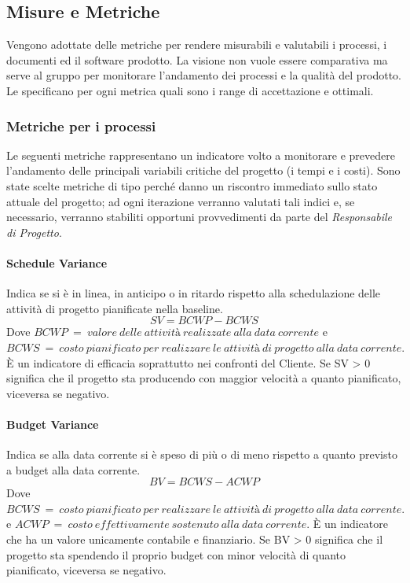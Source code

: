 		
	
	\subsection{Misure e Metriche}
	\label{MisureMetriche}
	Vengono adottate delle metriche per rendere misurabili e valutabili i processi, i documenti ed il software prodotto. La visione non vuole essere comparativa ma serve al gruppo per monitorare l'andamento dei processi e la qualità del prodotto. Le \NormeDiProgetto specificano per ogni metrica quali sono i range di accettazione e ottimali.
		
		\subsubsection{Metriche per i processi}
		Le seguenti metriche rappresentano un indicatore volto a monitorare e prevedere l'andamento delle principali variabili critiche del progetto (i tempi e i costi). Sono state scelte metriche di tipo  perché danno un riscontro immediato sullo stato attuale del progetto; ad ogni iterazione verranno valutati tali indici e, se necessario, verranno stabiliti opportuni provvedimenti da parte del \emph{Responsabile di Progetto}.
		
			\paragraph{Schedule Variance}		
			Indica se si è in linea, in anticipo o in ritardo rispetto alla schedulazione delle attività di progetto pianificate nella baseline.
			\[
			SV = BCWP - BCWS
			\]
			Dove $BCWP\  =\  valore \ delle \ attività \ realizzate \ alla\  data \ corrente$ e $BCWS \ = \ costo \ pianificato \ per\  realizzare\  le \ attività \ di \ progetto\  alla\  data \ corrente.$ 
			È un indicatore di efficacia soprattutto nei confronti del Cliente. Se SV > 0 significa che il progetto sta producendo con maggior velocità a quanto pianificato, viceversa se negativo.
			
			\paragraph{Budget Variance}
			Indica se alla data corrente si è speso di più o di meno rispetto a quanto previsto a budget alla data corrente.
			\[
			BV = BCWS - ACWP
			\]
			Dove $BCWS \ =\  costo\ pianificato\ per\ realizzare\ le\ attività \ di\  progetto \ alla\  data \ corrente.$ e $ACWP \ = \ costo \ effettivamente\  sostenuto \ alla \ data\  corrente.$
			È un indicatore che ha un valore unicamente contabile e finanziario. Se BV > 0 significa che il progetto sta spendendo il proprio budget con minor velocità di quanto pianificato, viceversa se negativo. 
			
